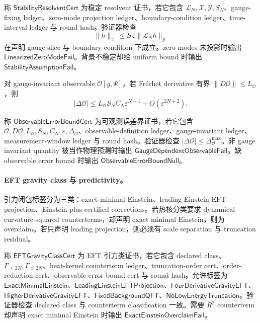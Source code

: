 \begin{definition}[稳定 resolvent 证书]\label{def:typed-address-biaxial-completion-stability-resolvent-cert}
称 \(\mathsf{StabilityResolventCert}\) 为稳定 resolvent 证书，若它包含 \(\mathcal L_N,\mathcal X,\mathcal Y,S_N\)、gauge-fixing ledger、zero-mode projection ledger、boundary-condition ledger、time-interval ledger 与 round hash。验证器检查
\[
\|h\|_{\mathcal X}\le S_N\|\mathcal L_Nh\|_{\mathcal Y}
\]
在声明 gauge slice 与 boundary condition 下成立。zero modes 未投影时输出 \(\mathsf{LinearizedZeroModeFail}\)。背景不稳定却给 uniform bound 时输出 \(\mathsf{StabilityAssumptionFail}\)。
\end{definition}

对 gauge-invariant observable \(\mathcal O[g,\Psi]\)，若 Fr\'echet derivative 有界 \(\|D\mathcal O\|\le L_{\mathcal O}\)，则
\[
\boxed{
|\Delta\mathcal O|
\le
L_{\mathcal O}S_NC_N\varepsilon^{N+1}
+O(\varepsilon^{2N+2}).
}
\]

\begin{definition}[可观测误差界证书]\label{def:typed-address-biaxial-completion-observable-error-bound-cert}
称 \(\mathsf{ObservableErrorBoundCert}\) 为可观测误差界证书，若它包含 \(\mathcal O,D\mathcal O,L_{\mathcal O},S_N,C_N,\varepsilon,\Delta_{\mathcal O}\)、observable-definition ledger、gauge-invariant ledger、measurement-window ledger 与 round hash。验证器检查 \(|\Delta\mathcal O|\le\Delta_{\mathcal O}^{\max}\)。非 gauge invariant quantity 被当作物理预测时输出 \(\mathsf{GaugeDependentObservableFail}\)。缺 observable error bound 时输出 \(\mathsf{ObservableErrorBoundNull}\)。
\end{definition}

\paragraph{EFT gravity class 与 predictivity。}
引力闭包标签分为三类：exact minimal Einstein、leading Einstein EFT projection、Einstein plus certified corrections。若热核分类要求 dynamical curvature-squared counterterms，却声明 exact minimal Einstein，则为 overclaim。若只声明 leading projection，则必须有 scale separation 与 truncation residual。

\begin{definition}\label{def:typed-address-biaxial-completion-eft-gravity-class-cert}
称 \(\mathsf{EFTGravityClassCert}\) 为 EFT 引力类证书，若它包含 declared class、\(\Gamma_{\le2N},\Gamma_{>2N}\)、heat-kernel counterterm ledger、truncation-order cert、order-reduction cert、observable-error-bound cert 与 round hash。允许标签为 \(\mathsf{ExactMinimalEinstein}\)、\(\mathsf{LeadingEinsteinEFTProjection}\)、\(\mathsf{FourDerivativeGravityEFT}\)、\(\mathsf{HigherDerivativeGravityEFT}\)、\(\mathsf{FixedBackgroundQFT}\)、\(\mathsf{NoLowEnergyTruncation}\)。验证器检查 declared class 与 counterterm classification 一致。需要 \(R^2\) counterterm 却声明 exact minimal Einstein 时输出 \(\mathsf{ExactEinsteinOverclaimFail}\)。
\end{definition}

